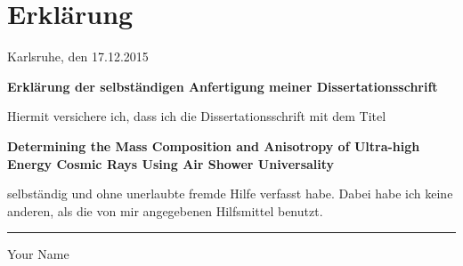
\chapter*{Erklärung}

\begin{flushright}
  Karlsruhe, den 17.12.2015
\end{flushright}

\vspace*{1cm}

\noindent \begin{flushleft}
\textbf{Erklärung der selbständigen Anfertigung meiner Dissertationsschrift
\vspace*{1cm}
}
\par\end{flushleft}

\noindent \begin{flushleft}
Hiermit versichere ich, dass ich die Dissertationsschrift mit dem Titel
\par\end{flushleft}

\begin{center}
\textbf{Determining the Mass Composition and Anisotropy of Ultra-high \\ Energy Cosmic Rays Using Air Shower Universality}\\
\par\end{center}
selbständig und ohne unerlaubte fremde Hilfe verfasst habe.
Dabei habe ich keine anderen, als die von mir angegebenen Hilfsmittel benutzt.

\vspace*{2cm}
\begin{minipage}[t]{0.3\columnwidth}%
\rule[0.5ex]{1\columnwidth}{1pt}

Your Name
\end{minipage}
